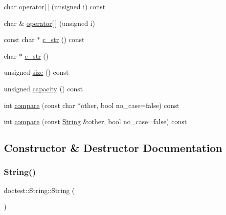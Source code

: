 \begin{DoxyCompactItemize}
\item 
char \hyperlink{classdoctest_1_1_string_adf69290bc23e8c7bf60a9bcf765ebc10}{operator\mbox{[}$\,$\mbox{]}} (unsigned i) const
\item 
char \& \hyperlink{classdoctest_1_1_string_acd37c72485c1277fc673f6b328138b40}{operator\mbox{[}$\,$\mbox{]}} (unsigned i)
\item 
const char $\ast$ \hyperlink{classdoctest_1_1_string_a607c6977b193fecf29622110e6081625}{c\+\_\+str} () const
\item 
char $\ast$ \hyperlink{classdoctest_1_1_string_a35df67f11652bcc568ad3af470c344c0}{c\+\_\+str} ()
\item 
unsigned \hyperlink{classdoctest_1_1_string_a9fbc7b09f1660b236f12fc2adce6183d}{size} () const
\item 
unsigned \hyperlink{classdoctest_1_1_string_adad8703f08950d173d2cb1426391fcdf}{capacity} () const
\item 
int \hyperlink{classdoctest_1_1_string_aef87d1f106d32d8c31af87335b44164d}{compare} (const char $\ast$other, bool no\+\_\+case=false) const
\item 
int \hyperlink{classdoctest_1_1_string_adb57becb56e054d981e7c2b967a7e359}{compare} (const \hyperlink{classdoctest_1_1_string}{String} \&other, bool no\+\_\+case=false) const
\end{DoxyCompactItemize}


\subsection{Constructor \& Destructor Documentation}
\mbox{\label{classdoctest_1_1_string_ab18d26f6c9e728c2fac77a501b8ca5f5}} 
\subsubsection{\texorpdfstring{String()}{String()}\hspace{0.1cm}{\footnotesize\ttfamily [1/5]}}
{\footnotesize\ttfamily doctest\+::\+String\+::\+String (\begin{DoxyParamCaption}{ }\end{DoxyParamCaption})}

\mbox{\label{classdoctest_1_1_string_af5dce5deeb8f25a4866efdff75e92975}} 
